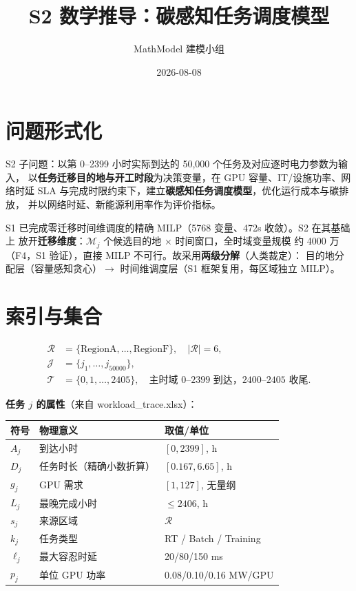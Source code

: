 \documentclass{internal-report}
\title{S2 数学推导：碳感知任务调度模型}
\author{MathModel 建模小组}
\date{2026-08-08}
\begin{document}
\maketitle

\section{问题形式化}

S2 子问题：以第 0--2399 小时实际到达的 50{,}000 个任务及对应逐时电力参数为输入，
以\textbf{任务迁移目的地与开工时段}为决策变量，在 GPU 容量、IT/设施功率、网络时延
SLA 与完成时限约束下，建立\textbf{碳感知任务调度模型}，优化运行成本与碳排放，
并以网络时延、新能源利用率作为评价指标。

S1 已完成零迁移时间维调度的精确 MILP（5768 变量、472s 收敛）。S2 在其基础上
放开\textbf{迁移维度}：$\mathcal{M}_j$ 个候选目的地 $\times$ 时间窗口，全时域变量规模
约 4000 万（F4，S1 验证），直接 MILP 不可行。故采用\textbf{两级分解}（人类裁定）：
目的地分配层（容量感知贪心）$\to$ 时间维调度层（S1 框架复用，每区域独立 MILP）。

\section{索引与集合}

\begin{align}
  \mathcal{R} &= \{\text{RegionA},\ldots,\text{RegionF}\},\quad |\mathcal{R}|=6,\\
  \mathcal{J} &= \{j_1,\ldots,j_{50000}\},\\
  \mathcal{T} &= \{0,1,\ldots,2405\}, \quad \text{主时域 } 0\text{--}2399 \text{ 到达，} 2400\text{--}2405 \text{ 收尾}.
\end{align}

\textbf{任务 $j$ 的属性}（来自 workload\_trace.xlsx）：

\begin{center}
\footnotesize
\begin{tabular}{lll}
\toprule
符号 & 物理意义 & 取值/单位 \\
\midrule
$A_j$ & 到达小时 & $[0,2399]$, h \\
$D_j$ & 任务时长（精确小数折算） & $[0.167,6.65]$, h \\
$g_j$ & GPU 需求 & $[1,127]$, 无量纲 \\
$L_j$ & 最晚完成小时 & $\le 2406$, h \\
$s_j$ & 来源区域 & $\mathcal{R}$ \\
$k_j$ & 任务类型 & RT / Batch / Training \\
$\ell_j$ & 最大容忍时延 & 20/80/150 ms \\
$p_j$ & 单位 GPU 功率 & 0.08/0.10/0.16 MW/GPU \\
\bottomrule
\end{tabular}
\end{center}
\end{document}
